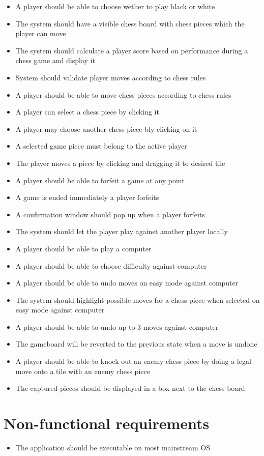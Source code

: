 \documentclass{article}
\begin{document}
\begin{itemize}
	\item A player should be able to choose wether to play black or white
	\item The system should have a visible chess board with chess pieces which the player can move
	\item The system should calculate a player score based on performance during a chess game and display it
	\item System should validate player moves according to chess rules
	\item A player should be able to move chess pieces according to chess rules
	\item A player can select a chess piece by clicking it
	\item A player may choose another chess piece bly clicking on it
	\item A selected game piece must belong to the active player
	\item The player moves a piece by clicking and dragging it to desired tile
	\item A player should be able to forfeit a game at any point
	\item A game is ended immediately a player forfeits
	\item A confirmation window should pop up when a player forfeits
	\item The system should let the player play against another player locally
	\item A player should be able to play a computer
	\item A player should be able to choose difficulty against computer
	\item A player should be able to undo moves on easy mode against computer
	\item The system should highlight possible moves for a chess piece when selected on easy mode against computer
	\item A player should be able to undo up to 3 moves against computer
	\item The gameboard will be reverted to the previous state when a move is undone
	\item A player should be able to knock out an enemy chess piece by doing a legal move onto a tile with an enemy chess piece
	\item The captured pieces should be displayed in a box next to the chess board
\end{itemize}

\section*{Non-functional requirements}
\begin{itemize}
	\item The application should be executable on most mainstream OS
\end{itemize}
\end{document}

